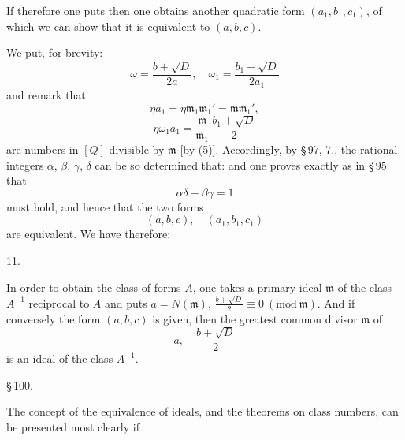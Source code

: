 
If therefore one puts
then one obtains another quadratic form $(a_1,b_1,c_1)$, of which we can show that it is equivalent to $(a,b,c)$.

We put, for brevity:
\[
\omega = \frac{b+\sqrt{D}}{2a},\quad \omega_1 = \frac{b_1+\sqrt{D}}{2a_1}
\]
and remark that
\[
\eta a_1 = \eta \mathfrak{m}_1\mathfrak{m}_1' = \mathfrak{m}\mathfrak{m}_1',
\]
\[
\eta \omega_1 a_1 = \frac{\mathfrak{m}}{\mathfrak{m}_1}\,\frac{b_1+\sqrt{D}}{2}
\]
are numbers in $[Q]$ divisible by $\mathfrak{m}$ [by (5)]. Accordingly, by \S\,97, 7., the rational integers $\alpha$, $\beta$, $\gamma$, $\delta$ can be so determined that:
and one proves exactly as in \S\,95 that
\[
\alpha\delta - \beta\gamma = 1
\]
must hold, and hence that the two forms
\[
(a,b,c),\quad (a_1,b_1,c_1)
\]
are equivalent. We have therefore:

11. 

In order to obtain the class of forms $A$, one takes a primary ideal $\mathfrak{m}$ of the class $A^{-1}$ reciprocal to $A$ and puts $a = N(\mathfrak{m})$,
$\frac{b+\sqrt{D}}{2} \equiv 0\ (\mathrm{mod}\ \mathfrak{m})$. And if conversely the form $(a,b,c)$ is given, then the greatest common divisor $\mathfrak{m}$ of
\[
a,\quad \frac{b+\sqrt{D}}{2}
\]
is an ideal of the class $A^{-1}$.

\begin{center}
\S\,100. 
\end{center}

The concept of the equivalence of ideals, and the theorems on class numbers, can be presented most clearly if
